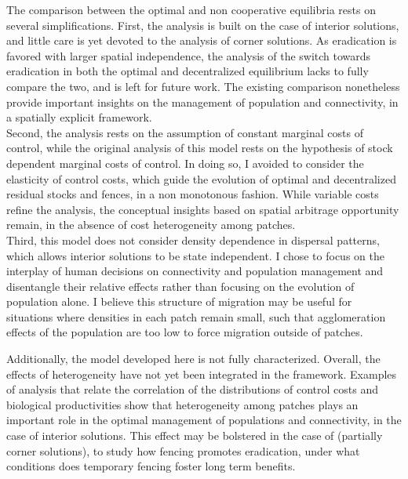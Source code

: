 The comparison between the optimal and non cooperative equilibria rests on several simplifications. First, the analysis is built on the case of interior solutions, and little care is yet devoted to the analysis of corner solutions. As eradication is favored with larger spatial independence, the analysis of the switch towards eradication in both the optimal and decentralized equilibrium lacks to fully compare the two, and is left for future work. The existing comparison nonetheless provide important insights on the management of population and connectivity, in a spatially explicit framework. \\
Second, the analysis rests on the assumption of constant marginal costs of control, while the original analysis of this model rests on the hypothesis of stock dependent marginal costs of control. In doing so, I avoided to consider the elasticity of control costs, which guide the evolution of optimal and decentralized residual stocks and fences, in a non monotonous fashion. While variable costs refine the analysis, the conceptual insights based on spatial arbitrage opportunity remain, in the absence of cost heterogeneity among patches.  \\
Third, this model does not consider density dependence in dispersal patterns, which allows interior solutions to be state independent. I chose to focus on the interplay of human decisions on connectivity and population management and disentangle their relative effects rather than focusing on the evolution of population alone. I believe this structure of migration may be useful for situations where densities in each patch remain small, such that agglomeration effects of the population are too low to force migration outside of patches. 

Additionally, the model developed here is not fully characterized. Overall, the effects of heterogeneity have not yet been integrated in the framework. Examples of analysis that relate the correlation of the distributions of control costs and biological productivities show that heterogeneity among patches plays an important role in the optimal management of populations and connectivity, in the case of interior solutions. This effect may be bolstered in the case of (partially corner solutions), to study how fencing promotes eradication, under what conditions does temporary fencing foster long term benefits. 

